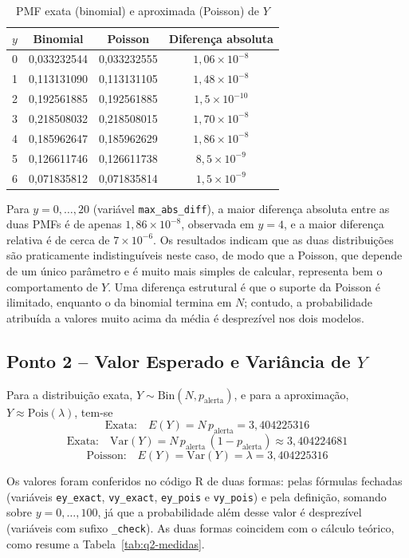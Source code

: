 \documentclass[10pt,a4paper]{article}
\begin{document}
\begin{table}[H]
\centering
\caption{PMF exata (binomial) e aproximada (Poisson) de $Y$}
\label{tab:q2-pmf}
\begin{tabular}{cccc}
\hline
$y$ & \textbf{Binomial} & \textbf{Poisson} & \textbf{Diferença absoluta} \\
\hline
0 & 0,033232544 & 0,033232555 & $1{,}06 \times 10^{-8}$ \\
1 & 0,113131090 & 0,113131105 & $1{,}48 \times 10^{-8}$ \\
2 & 0,192561885 & 0,192561885 & $1{,}5 \times 10^{-10}$ \\
3 & 0,218508032 & 0,218508015 & $1{,}70 \times 10^{-8}$ \\
4 & 0,185962647 & 0,185962629 & $1{,}86 \times 10^{-8}$ \\
5 & 0,126611746 & 0,126611738 & $8{,}5 \times 10^{-9}$ \\
6 & 0,071835812 & 0,071835814 & $1{,}5 \times 10^{-9}$ \\
\hline
\end{tabular}
\end{table}

Para $y = 0, \dots, 20$ (variável \texttt{max\_abs\_diff}), a maior diferença absoluta entre as duas PMFs é de apenas $1{,}86 \times 10^{-8}$, observada em $y = 4$, e a maior diferença 
relativa é de cerca de $7 \times 10^{-6}$. Os resultados indicam que as duas distribuições são praticamente indistinguíveis neste caso, de modo que a Poisson, que depende de um único 
parâmetro e é muito mais simples de calcular, representa bem o comportamento de $Y$. Uma diferença estrutural é que o suporte da Poisson é ilimitado, enquanto o da binomial termina em 
$N$; contudo, a probabilidade atribuída a valores muito acima da média é desprezível nos dois modelos.

\subsection{Ponto 2 -- Valor Esperado e Variância de $Y$}

Para a distribuição exata, $Y \sim \text{Bin}(N, p_{\text{alerta}})$, e para a aproximação, $Y \approx \text{Pois}(\lambda)$, tem-se
\[
\text{Exata:} \quad E(Y) = N\,p_{\text{alerta}} = 3{,}404225316
\]
\[
\text{Exata:} \quad \text{Var}(Y) = N\,p_{\text{alerta}}\,(1 - p_{\text{alerta}}) \approx 3{,}404224681
\]
\[
\text{Poisson:} \quad E(Y) = \text{Var}(Y) = \lambda = 3{,}404225316
\]

Os valores foram conferidos no código R de duas formas: pelas fórmulas fechadas (variáveis \texttt{ey\_exact}, \texttt{vy\_exact}, \texttt{ey\_pois} e \texttt{vy\_pois}) e pela 
definição, somando sobre $y = 0, \dots, 100$, já que a probabilidade além desse valor é desprezível (variáveis com sufixo \texttt{\_check}). As duas formas coincidem com o cálculo 
teórico, como resume a Tabela~\ref{tab:q2-medidas}.
\end{document}
